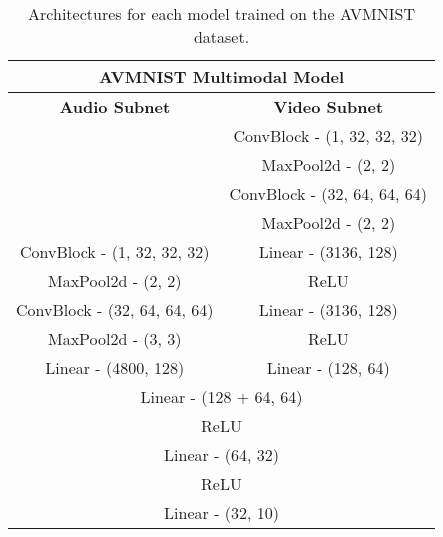 \begin{table}[h!]
    \footnotesize
    \caption{Architectures for each model trained on the AVMNIST dataset.}
    \label{tab:avmnist}
    \centering
    \begin{minipage}[t]{0.44\textwidth}
    \centering
    \vspace{0pt} %
        \begin{tabular}{clllllclllll}
            \hline
            \multicolumn{12}{c}{\textbf{AVMNIST Multimodal Model}}           \\ \hline
            \multicolumn{6}{c|}{\textbf{Audio Subnet}}   & \multicolumn{6}{c}{\textbf{Video Subnet}} \\ \hline
            \multicolumn{6}{c|}{}   & \multicolumn{6}{c}{ConvBlock  - (1, 32, 32, 32)} \\ \cline{7-12}
            \multicolumn{6}{c|}{}   & \multicolumn{6}{c}{MaxPool2d - (2, 2)} \\ \cline{7-12}
            \multicolumn{6}{c|}{}   & \multicolumn{6}{c}{ConvBlock - (32, 64, 64, 64)} \\ \cline{7-12}
            \multicolumn{6}{c|}{}   & \multicolumn{6}{c}{MaxPool2d - (2, 2)} \\ \hline
            \multicolumn{6}{c|}{ConvBlock  - (1, 32, 32, 32)}      & \multicolumn{6}{c}{Linear - (3136, 128)}    \\ \hline
            \multicolumn{6}{c|}{MaxPool2d - (2, 2)} &           \multicolumn{6}{c}{ReLU}      \\ \hline
            \multicolumn{6}{c|}{ConvBlock - (32, 64, 64, 64)}       & \multicolumn{6}{c}{Linear - (3136, 128)}    \\ \hline
            \multicolumn{6}{c|}{MaxPool2d - (3, 3)}     & \multicolumn{6}{c}{ReLU}      \\ \hline
            \multicolumn{6}{c|}{Linear - (4800, 128)}   & \multicolumn{6}{c}{Linear - (128, 64)}    \\ \hline
            \multicolumn{12}{c}{Linear - (128 + 64, 64)}                                      \\ \hline
            \multicolumn{12}{c}{ReLU}                                        \\ \hline
            \multicolumn{12}{c}{Linear - (64, 32)}                                      \\ \hline
            \multicolumn{12}{c}{ReLU}                                        \\ \hline
            \multicolumn{12}{c}{Linear - (32, 10)}                                      \\ \hline

\end{tabular}
\end{minipage}
\end{table}
